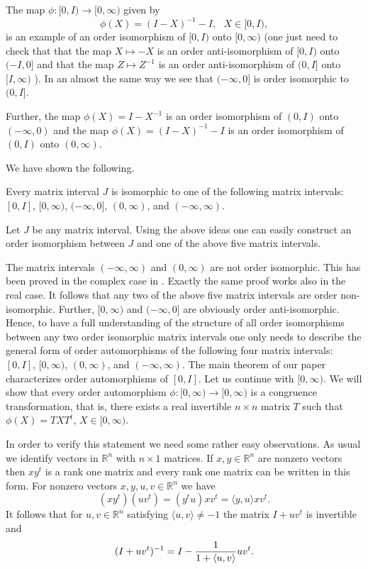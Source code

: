 \documentclass{article}
\begin{document}
The map $\phi : [0, I) \to [0, \infty)$ given by
$$
\phi (X) = (I -X)^{-1} - I , \ \ \ X \in [0, I),
$$
is an example of an order isomorphism of $[0,I)$ onto $[0, \infty)$ (one just need to check that
that the map $X \mapsto -X$ is an order anti-isomorphism of $[0,I)$ onto $(-I,0]$ and that the map $Z \mapsto Z^{-1}$ is an order anti-isomorphism of $(0,I]$ onto $[I, \infty)$ ).
In an almost the same way we see that $(- \infty, 0]$ is order isomorphic to $(0, I]$.

Further, the map $\phi (X) = I - X^{-1}$  is an order isomorphism of $(0,I)$ onto $(-\infty , 0)$ and
the map $\phi (X) = (I-X)^{-1} - I$ is an order isomorphism of $(0,I)$ onto $(0, \infty)$.



We have shown the following.

\begin{theorem}\label{zadprv}
Every matrix interval $J$ is isomorphic to one of the following matrix intervals: $[0,I]$, $[0, \infty)$, $(-\infty, 0]$, $(0, \infty)$, and $(-\infty , \infty )$.
\end{theorem}


Let $J$ be any matrix interval. Using the above ideas one can easily construct an order isomorphism between $J$ and 
one of the above five matrix intervals.

The matrix intervals $(-\infty, \infty)$ and $(0,\infty)$ are not order isomorphic. This has been proved in the complex case in \cite{Mo3}. Exactly the same proof works also in the real case. It follows that any two of the above five matrix intervals are order non-isomorphic.
Further, $[0, \infty)$     and $(-\infty , 0]$    are obviously order anti-isomorphic.
Hence, to have a full understanding of the structure of all order isomorphisms between any two order isomorphic matrix intervals one only needs
to describe the general form of order automorphisms of the following four 
matrix intervals: $[0,I]$, $[0, \infty)$, $(0, \infty)$, and $(-\infty , \infty )$. The main theorem of our paper characterizes order automorphisms of $[0,I]$. Let us continue with $[0, \infty)$. We will show that every order automorphism $\phi : [0, \infty) \to [0, \infty)$ is a congruence transformation, that is, there exists a real invertible $n \times n$ matrix $T$ such that $\phi (X) = TXT^t$, $X \in [0, \infty)$.

In order to verify this statement we need some rather easy observations. As usual we identify vectors in $\mathbb{R}^n$ with $n \times 1$ matrices. If $x,y \in \mathbb{R}^n$ are nonzero vectors then $xy^t$ is a rank one matrix and every rank one matrix can be written in this form. For nonzero vectors $x,y, u, v \in \mathbb{R}^n$ we have
$$
(xy^t ) (uv^t) = (y^t u) xv^t = \langle y,u \rangle xv^t .
$$
It follows that for $ u, v \in \mathbb{R}^n$ satisfying $\langle u,v \rangle \not= -1$ the matrix $I + uv^t$ is invertible and
$$
(I + uv^t)^{-1} =  I - { 1 \over 1 + \langle u,v \rangle} uv^t .
$$
\end{document}
